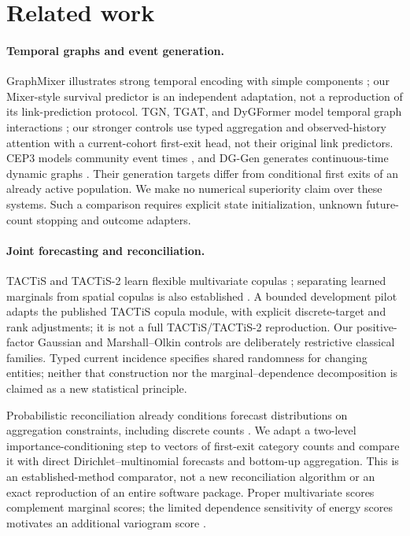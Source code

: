 \section{Related work}
\paragraph{Temporal graphs and event generation.}
GraphMixer illustrates strong temporal encoding with simple components
\citep{cong2023}; our Mixer-style survival predictor is an independent
adaptation, not a reproduction of its link-prediction protocol. TGN, TGAT,
and DyGFormer model temporal graph interactions \citep{rossi2020,xu2020,yu2023};
our stronger controls use typed aggregation and observed-history attention
with a current-cohort first-exit head, not their original link predictors.
CEP3 models
community event times \citep{wang2022}, and DG-Gen generates continuous-time
dynamic graphs \citep{hosseini2025}. Their generation targets differ from
conditional first exits of an already active population. We make no numerical
superiority claim over these systems. Such a comparison requires explicit
state initialization, unknown future-count stopping and outcome adapters.

\paragraph{Joint forecasting and reconciliation.}
TACTiS and TACTiS-2 learn flexible multivariate copulas
\citep{drouin2022,ashok2024}; separating learned marginals from spatial copulas
is also established \citep{huk2025}. A bounded development pilot adapts the
published TACTiS copula module, with explicit discrete-target and rank
adjustments; it is not a full TACTiS/TACTiS-2 reproduction.
Our positive-factor Gaussian and
Marshall--Olkin controls \citep{marshall1967} are deliberately restrictive
classical families. Typed current incidence specifies shared randomness for
changing entities; neither that construction nor the marginal--dependence
decomposition is claimed as a new statistical principle.

Probabilistic reconciliation already conditions forecast distributions on
aggregation constraints, including discrete counts \citep{zambon2024}.
We adapt a two-level importance-conditioning step to vectors of first-exit
category counts and compare it with direct Dirichlet--multinomial forecasts
and bottom-up aggregation. This is an established-method comparator, not a
new reconciliation algorithm or an exact reproduction of an entire software
package. Proper multivariate scores complement marginal scores; the limited
dependence sensitivity of energy scores motivates an additional variogram
score \citep{scheuerer2015}.


